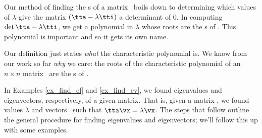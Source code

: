 \medskip


Our method of finding the \el s of a matrix \tta\ boils down to determining which values of $\lambda$ give the matrix $(\tta - \lambda\tti)$ a determinant of 0. In computing $\det{\tta-\lambda\tti}$, we get a polynomial in $\lambda$ whose roots are the \el s of \tta. This polynomial is important and so it gets its own name.

\smallskip


\smallskip

Our definition just states \textit{what} the characteristic polynomial is. We know from our work so far \textit{why} we care: the roots of the characteristic polynomial of an $n\times n$ matrix \tta\ are the \el s of \tta.

In Examples \ref{ex_find_el} and \ref{ex_find_ev}, we found eigenvalues and eigenvectors, respectively, of a given matrix. That is, given a matrix \tta, we found values $\lambda$ and vectors \vx\ such that $\tta\vx = \lambda\vx$. The steps that follow outline the general procedure for finding eigenvalues and eigenvectors; we'll follow this up with some examples.

\smallskip


\medskip

